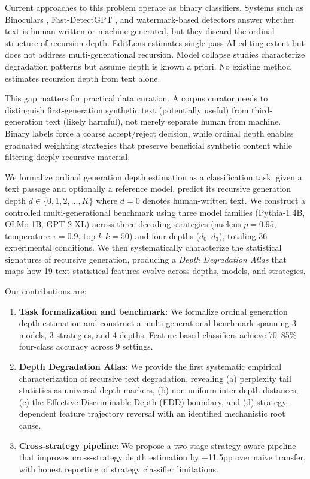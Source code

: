 \documentclass[11pt,a4paper]{article}
\begin{document}
Current approaches to this problem operate as binary classifiers. Systems such as Binoculars \citep{hans2024spotting}, Fast-DetectGPT \citep{bao2024fast}, and watermark-based detectors \citep{kirchenbauer2023watermark} answer whether text is human-written or machine-generated, but they discard the ordinal structure of recursion depth. EditLens \citep{wang2024editlens} estimates single-pass AI editing extent but does not address multi-generational recursion. Model collapse studies characterize degradation patterns \citep{shumailov2024ai,drayson2025quality} but assume depth is known a priori. No existing method estimates recursion depth from text alone.

This gap matters for practical data curation. A corpus curator needs to distinguish first-generation synthetic text (potentially useful) from third-generation text (likely harmful), not merely separate human from machine. Binary labels force a coarse accept/reject decision, while ordinal depth enables graduated weighting strategies that preserve beneficial synthetic content while filtering deeply recursive material.

We formalize ordinal generation depth estimation as a classification task: given a text passage and optionally a reference model, predict its recursive generation depth $d \in \{0, 1, 2, \ldots, K\}$ where $d{=}0$ denotes human-written text. We construct a controlled multi-generational benchmark using three model families (Pythia-1.4B, OLMo-1B, GPT-2 XL) across three decoding strategies (nucleus $p{=}0.95$, temperature $\tau{=}0.9$, top-$k$ $k{=}50$) and four depths ($d_0$--$d_3$), totaling 36 experimental conditions. We then systematically characterize the statistical signatures of recursive generation, producing a \textit{Depth Degradation Atlas} that maps how 19 text statistical features evolve across depths, models, and strategies.

Our contributions are:
\begin{enumerate}
    \item \textbf{Task formalization and benchmark}: We formalize ordinal generation depth estimation and construct a multi-generational benchmark spanning 3 models, 3 strategies, and 4 depths. Feature-based classifiers achieve 70--85\% four-class accuracy across 9 settings.
    \item \textbf{Depth Degradation Atlas}: We provide the first systematic empirical characterization of recursive text degradation, revealing (a) perplexity tail statistics as universal depth markers, (b) non-uniform inter-depth distances, (c) the Effective Discriminable Depth (EDD) boundary, and (d) strategy-dependent feature trajectory reversal with an identified mechanistic root cause.
    \item \textbf{Cross-strategy pipeline}: We propose a two-stage strategy-aware pipeline that improves cross-strategy depth estimation by +11.5pp over naive transfer, with honest reporting of strategy classifier limitations.
\end{enumerate}
\end{document}
